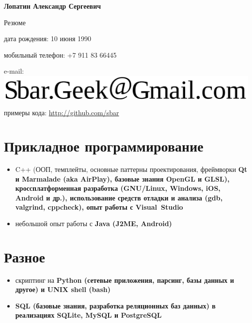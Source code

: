\begin{center}
\fontsize{16pt}{14pt}\selectfont
\bfseries Лопатин Александр Сергеевич\mdseries

\fontsize{14pt}{14pt}\selectfont
Резюме
\end{center}
{
\fontsize{12pt}{12pt}\selectfont
\begin{flushright}
\item дата рождения: 10 июня 1990
\item мобильный телефон: +7 911 83 66445
\item e-mail: \includegraphics[scale=0.2]{email}
\item примеры кода: \url{http://github.com/sbar}
\end{flushright}
}

\setcounter{section}{0}
\section{Прикладное программирование}
\begin{itemize}
\item C++ (ООП, темплейты, основные паттерны проектирования,
фреймворки
\bfseries Qt \mdseries и
\bfseries Marmalade \mdseries
(aka \bfseries AirPlay\mdseries),
базовые знания \bfseries OpenGL \mdseries и \bfseries GLSL\mdseries),
кроссплатформенная разработка
(\bfseries GNU/Linux\mdseries, Windows, iOS, \bfseries Android \mdseries и др.),
использование средств отладки и анализа (gdb, valgrind, cppcheck),
опыт работы с Visual~Studio
\item небольшой опыт работы с \bfseries Java \mdseries (J2ME, Android)
\end{itemize}

\section{Разное}
\begin{itemize}
\item скриптинг на \bfseries Python \mdseries
(сетевые приложения, парсинг, базы данных и другое) и
\bfseries UNIX shell (bash)\mdseries
\item \bfseries SQL \mdseries (базовые знания, разработка реляционных баз данных)
в реализациях SQLite, MySQL и PostgreSQL
\end{itemize}

